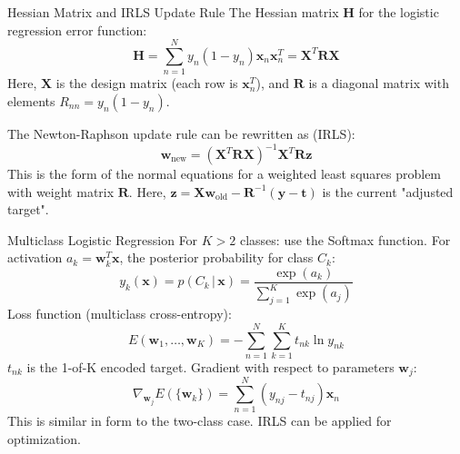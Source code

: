 \documentclass{beamer} %
\newcommand{\mat}[1]{\mathbf{#1}}
\newcommand{\vect}[1]{\mathbf{#1}}
\newcommand{\given}{\,|\,}
\begin{document}
\begin{frame}{Hessian Matrix and IRLS Update Rule}
  The Hessian matrix $\mat{H}$ for the logistic regression error function:
  \begin{equation*}
    \mat{H} = \sum_{n=1}^{N} y_n (1 - y_n) \vect{x}_n \vect{x}_n^T = \mat{X}^T \mat{R} \mat{X}
  \end{equation*}
  Here, $\mat{X}$ is the design matrix (each row is $\vect{x}_n^T$), and $\mat{R}$ is a diagonal matrix with elements $R_{nn} = y_n (1 - y_n)$.

  \vspace{0.5em}
  The Newton-Raphson update rule can be rewritten as (IRLS):
  \begin{equation*}
    \vect{w}_{\text{new}} = (\mat{X}^T \mat{R} \mat{X})^{-1} \mat{X}^T \mat{R} \vect{z}
  \end{equation*}
  This is the form of the normal equations for a weighted least squares problem with weight matrix $\mat{R}$.
  Here, $\vect{z} = \mat{X} \vect{w}_{\text{old}} - \mat{R}^{-1} (\vect{y} - \vect{t})$ is the current "adjusted target".
\end{frame}

\begin{frame}{Multiclass Logistic Regression}
  For $K > 2$ classes: use the Softmax function.
  For activation $a_k = \vect{w}_k^T \vect{x}$, the posterior probability for class $C_k$:
  \begin{equation*}
    y_k(\vect{x}) = p(C_k \given \vect{x}) = \frac{\exp(a_k)}{\sum_{j=1}^{K} \exp(a_j)}
  \end{equation*}
  Loss function (multiclass cross-entropy):
  \begin{equation*}
    E(\vect{w}_1, \dots, \vect{w}_K) = -\sum_{n=1}^{N} \sum_{k=1}^{K} t_{nk} \ln y_{nk}
  \end{equation*}
  $t_{nk}$ is the 1-of-K encoded target.
  \vspace{0.5em}
  Gradient with respect to parameters $\vect{w}_j$:
  \begin{equation*}
    \nabla_{\vect{w}_j} E(\{\vect{w}_k\}) = \sum_{n=1}^{N} (y_{nj} - t_{nj}) \vect{x}_n
  \end{equation*}
  This is similar in form to the two-class case. IRLS can be applied for optimization.
\end{frame}
\end{document}
